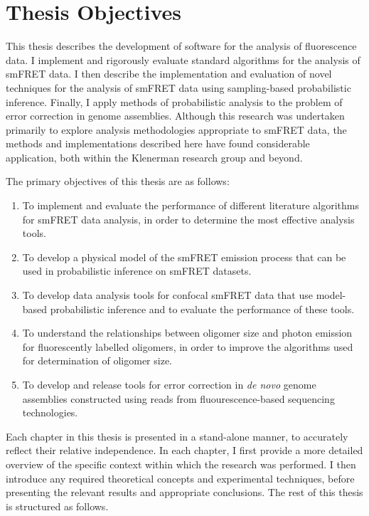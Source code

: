 \section{Thesis Objectives}
This thesis describes the development of software for the analysis of fluorescence data. I implement and rigorously evaluate standard algorithms for the analysis of smFRET data. I then describe the implementation and evaluation of novel techniques for the analysis of smFRET data using sampling-based probabilistic inference. Finally, I apply methods of probabilistic analysis to the problem of error correction in genome assemblies. Although this research was undertaken primarily to explore analysis methodologies appropriate to smFRET data, the methods and implementations described here have found considerable application, both within the Klenerman research group and beyond.

The primary objectives of this thesis are as follows:

\begin{enumerate}

\item To implement and evaluate the performance of different literature algorithms for smFRET data analysis, in order to determine the most effective analysis tools.

\item To develop a physical model of the smFRET emission process that can be used in probabilistic inference on smFRET datasets.

\item To develop data analysis tools for confocal smFRET data that use model-based probabilistic inference and to evaluate the performance of these tools.

\item To understand the relationships between oligomer size and photon emission for fluorescently labelled oligomers, in order to improve the algorithms used for determination of oligomer size.

\item To develop and release tools for error correction in \emph{de novo} genome assemblies constructed using reads from fluourescence-based sequencing technologies.    

\end{enumerate}

Each chapter in this thesis is presented in a stand-alone manner, to accurately reflect their relative independence. In each chapter, I first provide a more detailed overview of the specific context within which the research was performed. I then introduce any required theoretical concepts and experimental techniques, before presenting the relevant results and appropriate conclusions. The rest of this thesis is structured as follows.

